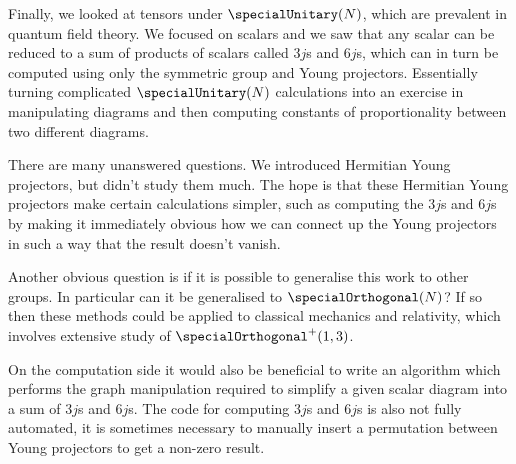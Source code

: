 \documentclass[fleqn]{NotesClass}
\begin{document}
    Finally, we looked at tensors under \(\specialUnitary(N)\), which are prevalent in quantum field theory.
    We focused on scalars and we saw that any scalar can be reduced to a sum of products of scalars called \(3j\)s and \(6j\)s, which can in turn be computed using only the symmetric group and Young projectors.
    Essentially turning complicated \(\specialUnitary(N)\) calculations into an exercise in manipulating diagrams and then computing constants of proportionality between two different diagrams.
    
    There are many unanswered questions.
    We introduced Hermitian Young projectors, but didn't study them much.
    The hope is that these Hermitian Young projectors make certain calculations simpler, such as computing the \(3j\)s and \(6j\)s by making it immediately obvious how we can connect up the Young projectors in such a way that the result doesn't vanish.
    
    Another obvious question is if it is possible to generalise this work to other groups.
    In particular can it be generalised to \(\specialOrthogonal(N)\)?
    If so then these methods could be applied to classical mechanics and relativity, which involves extensive study of \(\specialOrthogonal^+(1, 3)\).
    
    On the computation side it would also be beneficial to write an algorithm which performs the graph manipulation required to simplify a given scalar diagram into a sum of \(3j\)s and \(6j\)s.
    The code for computing \(3j\)s and \(6j\)s is also not fully automated, it is sometimes necessary to manually insert a permutation between Young projectors to get a non-zero result.
    
    
    
    
\end{document}
